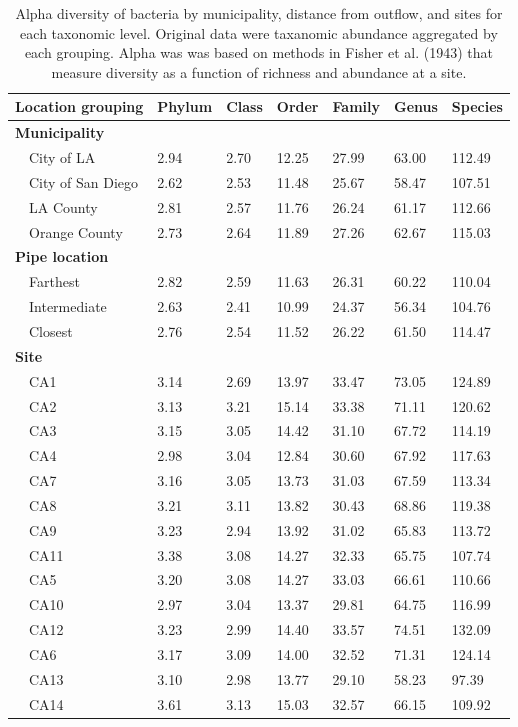 \documentclass[letterpaper,12pt]{article}\usepackage[]{graphicx}\usepackage[]{color}
\begin{document}
\begin{table}[!tbp]
\caption{Alpha diversity of bacteria by municipality, distance from outflow, and sites for each taxonomic level.  Original data were taxanomic abundance aggregated by each grouping.  Alpha was was based on methods in Fisher et al. (1943) that measure diversity as a function of richness and abundance at a site.\label{tab:alpha_bac}} 
\begin{center}
\begin{tabular}{lllllll}
\hline\hline
\multicolumn{1}{l}{Location grouping}&\multicolumn{1}{c}{Phylum}&\multicolumn{1}{c}{Class}&\multicolumn{1}{c}{Order}&\multicolumn{1}{c}{Family}&\multicolumn{1}{c}{Genus}&\multicolumn{1}{c}{Species}\tabularnewline
\hline
{\bfseries Municipality}&&&&&&\tabularnewline
~~City of LA&2.94&2.70&12.25&27.99&63.00&112.49\tabularnewline
~~City of San Diego&2.62&2.53&11.48&25.67&58.47&107.51\tabularnewline
~~LA County&2.81&2.57&11.76&26.24&61.17&112.66\tabularnewline
~~Orange County&2.73&2.64&11.89&27.26&62.67&115.03\tabularnewline
\hline
{\bfseries Pipe location}&&&&&&\tabularnewline
~~Farthest&2.82&2.59&11.63&26.31&60.22&110.04\tabularnewline
~~Intermediate&2.63&2.41&10.99&24.37&56.34&104.76\tabularnewline
~~Closest&2.76&2.54&11.52&26.22&61.50&114.47\tabularnewline
\hline
{\bfseries Site}&&&&&&\tabularnewline
~~CA1&3.14&2.69&13.97&33.47&73.05&124.89\tabularnewline
~~CA2&3.13&3.21&15.14&33.38&71.11&120.62\tabularnewline
~~CA3&3.15&3.05&14.42&31.10&67.72&114.19\tabularnewline
~~CA4&2.98&3.04&12.84&30.60&67.92&117.63\tabularnewline
~~CA7&3.16&3.05&13.73&31.03&67.59&113.34\tabularnewline
~~CA8&3.21&3.11&13.82&30.43&68.86&119.38\tabularnewline
~~CA9&3.23&2.94&13.92&31.02&65.83&113.72\tabularnewline
~~CA11&3.38&3.08&14.27&32.33&65.75&107.74\tabularnewline
~~CA5&3.20&3.08&14.27&33.03&66.61&110.66\tabularnewline
~~CA10&2.97&3.04&13.37&29.81&64.75&116.99\tabularnewline
~~CA12&3.23&2.99&14.40&33.57&74.51&132.09\tabularnewline
~~CA6&3.17&3.09&14.00&32.52&71.31&124.14\tabularnewline
~~CA13&3.10&2.98&13.77&29.10&58.23& 97.39\tabularnewline
~~CA14&3.61&3.13&15.03&32.57&66.15&109.92\tabularnewline
\hline
\end{tabular}\end{center}

\end{table}
\end{document}
